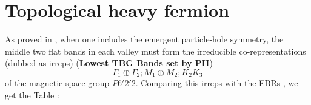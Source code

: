 \documentclass[a4paper,12pt]{report}
\begin{document}


\chapter{Topological heavy fermion}


As proved in \cite{all_magic_angles}, when one includes the emergent particle-hole symmetry, the middle two flat bands in each valley must form the irreducible co-representations (dubbed as irreps) (\textbf{Lowest TBG Bands set by PH})
\begin{equation} \label{eq:matbg-irreps}
\Gamma_1 \oplus \Gamma_2; M_1 \oplus M_2; K_2 K_3
\end{equation}
of the magnetic space group $P6'2'2$. Comparing this irreps with the EBRs \cite{topological_quantum_chemistry}, we get the Table \cite{tab:matbg-irreps}:
\end{document}

